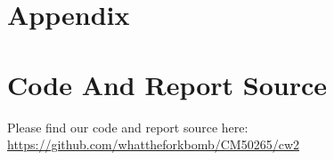 
\section*{\Large Appendix}
\appendix

\section{Code And Report Source}
Please find our code and report source here: \url{https://github.com/whattheforkbomb/CM50265/cw2}

